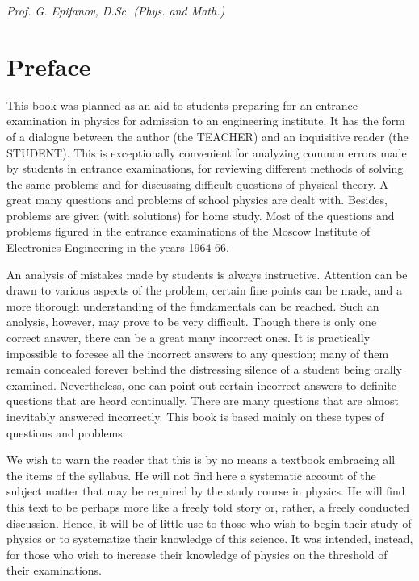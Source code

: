 \vspace{0.2in}

 \hfill \emph{Prof. G. Epifanov, D.Sc. (Phys. and Math.)}



\section{Preface}
\thispagestyle{empty}


\hspace{5mm}This book was planned as an aid to students preparing for an entrance examination in physics for admission to an engineering institute. It has the form of a dialogue between the author (the TEACHER) and an inquisitive reader (the STUDENT). This is exceptionally convenient for analyzing common errors made by students in entrance examinations, for reviewing different methods of solving the same problems and for discussing difficult questions of physical theory. A great many questions and problems of school physics are dealt with. Besides, problems are given (with solutions) for home study. Most of the questions and problems figured in the entrance examinations of the Moscow Institute of Electronics Engineering in the years 1964-66. 

\vspace{2mm}

An analysis of mistakes made by students is always instructive. Attention can be drawn to various aspects of the problem, certain fine points can be made, and a more thorough understanding of the fundamentals can be reached. Such an analysis, however, may prove to be very difficult. Though there is only one correct answer, there can be a great many incorrect ones. It is practically impossible to foresee all the incorrect answers to any question; many of them remain concealed forever behind the distressing silence of a student being orally examined. Nevertheless, one can point out certain incorrect answers to definite questions that are heard continually. There are many questions that are almost inevitably answered incorrectly. This book is based mainly on these types of questions and problems. 

\vspace{2mm}

We wish to warn the reader that this is by no means a textbook embracing all the items of the syllabus. He will not find here a systematic account of the subject matter that may be required by the study course in physics. He will find this text to be perhaps more like a freely told story or, rather, a freely conducted discussion. Hence, it will be of little use to those who wish to begin their study of physics or to systematize their knowledge of this science. It was intended, instead, for those who wish to increase their knowledge of physics on the threshold of their examinations. 

